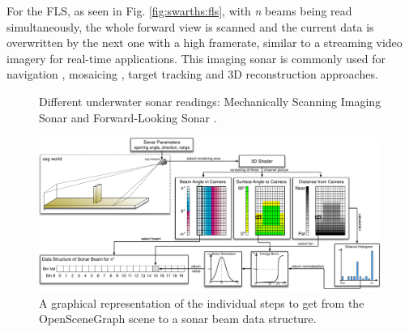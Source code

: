 \documentclass[final,5p,times]{elsarticle}
\begin{document}
For the FLS, as seen in Fig. \ref{fig:swarths:fls}, with \textit{n} beams being read simultaneously, the whole forward view is scanned and the current data is overwritten by the next one with a high framerate, similar to a streaming video imagery for real-time applications. This imaging sonar is commonly used for navigation \cite{fallon2013}, mosaicing \cite{hurtos2014}, target tracking \cite{liu2016} and 3D reconstruction \cite{huang2015} approaches.

\begin{figure}[h]
    \centering
    \captionsetup{justification=centering}
    \caption{Different underwater sonar readings: Mechanically Scanning Imaging Sonar  and Forward-Looking Sonar .}
    \label{fig:sonar_devices}
\end{figure}


\begin{figure}[!h]
    \includegraphics[width=0.85\paperwidth]{figs/sonar_sim}
    \centering
    \captionsetup{justification=centering}
    \caption{A graphical representation of the individual steps to get from the OpenSceneGraph scene to a sonar beam data structure.}
    \label{fig:sonar_sim}
\end{figure}
\end{document}
